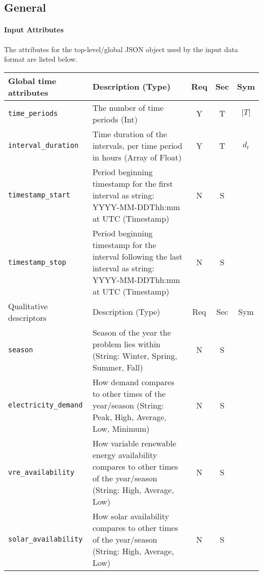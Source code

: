 \documentclass{article}
\begin{document}
\subsection{General}
\label{nom:top-level}

\paragraph{Input Attributes}
The attributes for the top-level/global JSON object
used by the input data format are listed below.

\begin{center}
\small
\begin{tabular}{ l | p{3.5in} | c | c | c |}
Global time attributes & Description (Type) & Req & Sec & Sym\\
\hline
  {\tt time\_periods} & The number of time periods (Int) & Y & T & $\lvert T \rvert$ \\
  {\tt interval\_duration} & Time duration of the intervals, per time period in hours (Array of Float) & Y & T & $d_t$ \\
                           \hline
 {\tt timestamp\_start} & Period beginning timestamp for the first interval as string: YYYY-MM-DDThh:mm at UTC (Timestamp)& N & S & \\  
 {\tt timestamp\_stop} & Period beginning timestamp for the interval following the last interval as string: YYYY-MM-DDThh:mm at UTC (Timestamp)& N & S & \\
\hline
Qualitative descriptors & Description (Type) & Req & Sec & Sym\\
\hline
  {\tt season} & Season of the year the problem lies within (String: Winter, Spring, Summer, Fall) & N & S & \\
  {\tt electricity\_demand} & How demand compares to other times of the year/season (String: Peak, High, Average, Low, Minimum) & N & S & \\
  {\tt vre\_availability} & How variable renewable energy availability compares to other times of the year/season (String: High, Average, Low) & N & S & \\
  {\tt solar\_availability} & How solar availability compares to other times of the year/season (String: High, Average, Low) & N & S & \\

\end{tabular}
\end{center}
\end{document}
